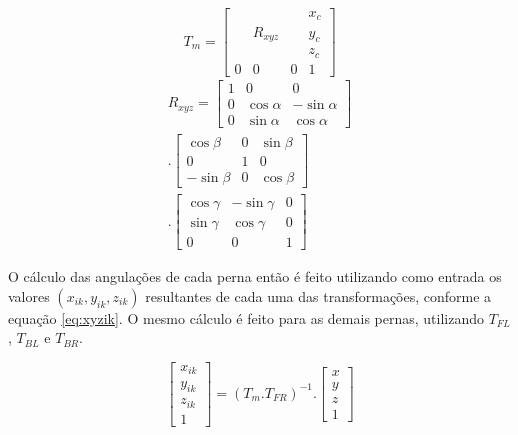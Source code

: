 \documentclass[../main.tex]{subfiles}
\begin{document}
\begin{equation}
  \label{eq:Tm}
  T_m =
  \begin{bmatrix}
      &         &   & x_c \\
      & R_{xyz} &   & y_c \\
      &         &   & z_c \\
    0 & 0       & 0 & 1
  \end{bmatrix}
\end{equation}
\begin{equation}
  \label{eq:Rxyz}
  \begin{split}
    R_{xyz} =
    \begin{bmatrix}
      1 & 0          & 0           \\
      0 & \cos\alpha & -\sin\alpha \\
      0 & \sin\alpha & \cos\alpha
    \end{bmatrix}
    \\.
    \begin{bmatrix}
      \cos\beta  & 0 & \sin\beta \\
      0          & 1 & 0         \\
      -\sin\beta & 0 & \cos\beta
    \end{bmatrix}
    \\.
    \begin{bmatrix}
      \cos\gamma & -\sin\gamma & 0 \\
      \sin\gamma & \cos\gamma  & 0 \\
      0          & 0           & 1
    \end{bmatrix}
  \end{split}
\end{equation}

O cálculo das angulações de cada perna então é feito utilizando como entrada os valores $(x_{ik}, y_{ik}, z_{ik})$ resultantes de cada uma das transformações, conforme a equação \ref{eq:xyzik}. O mesmo cálculo é feito para as demais pernas, utilizando  $T_{FL}$, $T_{BL}$ e $T_{BR}$.

\begin{equation}
  \label{eq:xyzik}
  \begin{bmatrix}
    x_{ik} \\
    y_{ik} \\
    z_{ik} \\
    1
  \end{bmatrix}= (T_m.T_{FR})^{-1}.
  \begin{bmatrix}
    x \\
    y \\
    z \\
    1
  \end{bmatrix}
\end{equation}
\end{document}
